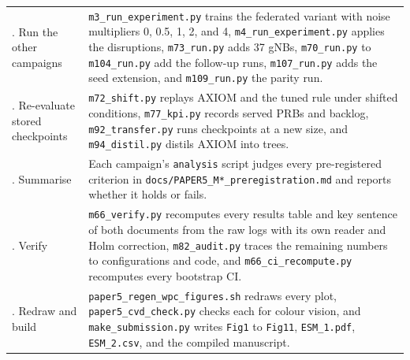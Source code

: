 \documentclass[9pt]{extarticle}
\begin{document}
\begin{table}[!htbp]
{\begin{tabular}{@{}>{\raggedright\arraybackslash}p{2.35cm}>{\raggedright\arraybackslash}p{10.35cm}@{}}
3. Run the other campaigns & \texttt{m3\_run\_experiment.py} trains the federated variant with noise multipliers 0, 0.5, 1, 2, and 4, \texttt{m4\_run\_experiment.py} applies the disruptions, \texttt{m73\_run.py} adds 37 gNBs, \texttt{m70\_run.py} to \texttt{m104\_run.py} add the follow-up runs, \texttt{m107\_run.py} adds the seed extension, and \texttt{m109\_run.py} the parity run. \\
4. Re-evaluate stored checkpoints & \texttt{m72\_shift.py} replays AXIOM and the tuned rule under shifted conditions, \texttt{m77\_kpi.py} records served PRBs and backlog, \texttt{m92\_transfer.py} runs checkpoints at a new size, and \texttt{m94\_distil.py} distils AXIOM into trees. \\
5. Summarise & Each campaign's \texttt{analysis} script judges every pre-registered criterion in \texttt{docs/PAPER5\_M*\_preregistration.md} and reports whether it holds or fails. \\
6. Verify & \texttt{m66\_verify.py} recomputes every results table and key sentence of both documents from the raw logs with its own reader and Holm correction, \texttt{m82\_audit.py} traces the remaining numbers to configurations and code, and \texttt{m66\_ci\_recompute.py} recomputes every bootstrap CI. \\
7. Redraw and build & \texttt{paper5\_regen\_wpc\_figures.sh} redraws every plot, \texttt{paper5\_cvd\_check.py} checks each for colour vision, and \texttt{make\_submission.py} writes \texttt{Fig1} to \texttt{Fig11}, \texttt{ESM\_1.pdf}, \texttt{ESM\_2.csv}, and the compiled manuscript. \\
\bottomrule
\end{tabular}}
\end{table}
\end{document}
